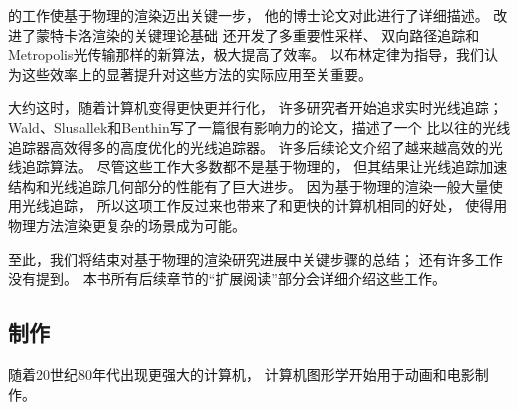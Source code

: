 \citeauthor{veach1997robust}的工作使基于物理的渲染迈出关键一步，
他的博士论文\citep{veach1997robust}对此进行了详细描述。
\citeauthor{veach1997robust}改进了蒙特卡洛渲染的关键理论基础
还开发了多重要性采样、
双向路径追踪和Metropolis光传输那样的新算法，极大提高了效率。
以布林定律为指导，我们认为这些效率上的显著提升对这些方法的实际应用至关重要。

大约这时，随着计算机变得更快更并行化，
许多研究者开始追求实时光线追踪；
Wald、Slusallek和Benthin写了一篇很有影响力的论文，描述了一个
比以往的光线追踪器高效得多的高度优化的光线追踪器\citep{10.1007/978-3-7091-6242-2_26}。
许多后续论文介绍了越来越高效的光线追踪算法。
尽管这些工作大多数都不是基于物理的，
但其结果让光线追踪加速结构和光线追踪几何部分的性能有了巨大进步。
因为基于物理的渲染一般大量使用光线追踪，
所以这项工作反过来也带来了和更快的计算机相同的好处，
使得用物理方法渲染更复杂的场景成为可能。

至此，我们将结束对基于物理的渲染研究进展中关键步骤的总结；
还有许多工作没有提到。
本书所有后续章节的“扩展阅读”部分会详细介绍这些工作。

\subsection{制作}\label{sub:制作}
随着20世纪80年代出现更强大的计算机，
计算机图形学开始用于动画和电影制作。